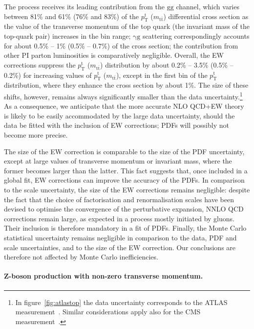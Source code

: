 The process receives its leading contribution from the $\mathrm{gg}$ channel,
which varies between 81\% and 61\% (76\% and 83\%) of the $p_\mathrm{T}^\mathrm{t}$
($m_{\mathrm{t}\bar{\mathrm{t}}}$) differential cross section as the value of the
transverse momentum of the top quark (the invariant mass of the top-quark pair)
increases in the bin range; $\mathrm{\gamma}\mathrm{g}$ scattering
correspondingly accounts for about 0.5\% -- 1\% (0.5\% -- 0.7\%) of the cross
section; the contribution from other PI parton luminosities is comparatively
negligible. Overall, the EW corrections suppress the $p_\mathrm{T}^\mathrm{t}$
($m_{\mathrm{t}\bar{\mathrm{t}}}$) distribution by about 0.2\% -- 3.5\%
(0.5\% -- 0.2\%) for increasing values of $p_\mathrm{T}^\mathrm{t}$
($m_{\mathrm{t}\bar{\mathrm{t}}}$), except in the first bin of the
$p_\mathrm{T}^\mathrm{t}$ distribution, where they enhance the cross section by
about 1\%. The size of these shifts, however, remains always significantly
smaller than the data uncertainty.\footnote{In
  figure~\ref{fig:atlastop} the data uncertainty corresponds to the ATLAS
  measurement~\cite{Aad:2015auj}. Similar considerations apply also for the CMS
  measurement~\cite{Khachatryan:2015oaa}.}
As a consequence, we anticipate that the more accurate NLO QCD+EW theory is
likely to be easily accommodated by the large data uncertainty, should the data
be fitted with the inclusion of EW corrections; PDFs will possibly not become
more precise.

The size of the EW correction is comparable to the size of the PDF uncertainty,
except at large values of transverse momentum or invariant mass, where the
former becomes larger than the latter. This fact suggests that, once included in
a global fit, EW corrections can improve the accuracy of the PDFs. In comparison
to the scale uncertainty, the size of the EW corrections remains negligible:
despite the fact that the choice of factorisation and renormalisation scales
have been devised to optimise the convergence of the perturbative expansion,
NNLO QCD corrections remain large, as expected in a process mostly initiated
by gluons. Their inclusion is therefore mandatory in a fit of PDFs. Finally,
the Monte Carlo statistical uncertainty remains negligible in comparison to the
data, PDF and scale uncertainties, and to the size of the EW correction. Our
conclusions are therefore not affected by Monte Carlo inefficiencies.

\paragraph{Z-boson production with non-zero transverse momentum.}

